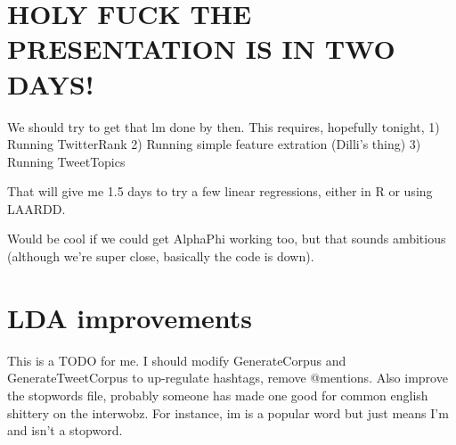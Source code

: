 \section*{HOLY FUCK THE PRESENTATION IS IN TWO DAYS!}

We should try to get that lm done by then.
This requires, hopefully tonight,
1) Running TwitterRank
2) Running simple feature extration (Dilli's thing)
3) Running TweetTopics

That will give me 1.5 days to try a few linear regressions, either in R or using LAARDD.

Would be cool if we could get AlphaPhi working too, but that sounds ambitious (although we're super close, basically the code is down).

\section*{LDA improvements}

This is a TODO for me.  
I should modify GenerateCorpus and GenerateTweetCorpus to up-regulate hashtags, remove @mentions.
Also improve the stopwords file, probably someone has made one good for common english shittery on the interwobz.
For instance, im is a popular word but just means I'm and isn't a stopword.  

